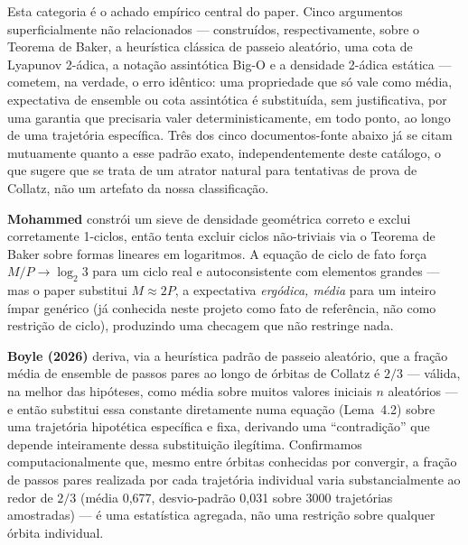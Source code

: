 \documentclass[11pt]{article}
\begin{document}
Esta categoria é o achado empírico central do paper. Cinco argumentos
superficialmente não relacionados --- construídos, respectivamente,
sobre o Teorema de Baker, a heurística clássica de passeio aleatório,
uma cota de Lyapunov 2-ádica, a notação assintótica Big-O e a
densidade 2-ádica estática --- cometem, na verdade, o erro idêntico:
uma propriedade que só vale como média, expectativa de ensemble ou cota
assintótica é substituída, sem justificativa, por uma garantia que
precisaria valer deterministicamente, em todo ponto, ao longo de uma
trajetória específica. Três dos cinco documentos-fonte abaixo já se
citam mutuamente quanto a esse padrão exato, independentemente deste
catálogo, o que sugere que se trata de um atrator natural para
tentativas de prova de Collatz, não um artefato da nossa classificação.

\textbf{Mohammed} \cite{Mohammed2024} constrói um sieve de densidade
geométrica correto e exclui corretamente 1-ciclos, então tenta excluir
ciclos não-triviais via o Teorema de Baker sobre formas lineares em
logaritmos. A equação de ciclo de fato força $M/P \to \log_2 3$ para um
ciclo real e autoconsistente com elementos grandes --- mas o paper
substitui $M \approx 2P$, a expectativa \emph{ergódica, média} para um
inteiro ímpar genérico (já conhecida neste projeto como fato de
referência, não como restrição de ciclo), produzindo uma checagem que
não restringe nada.

\textbf{Boyle (2026)} \cite{Boyle2026} deriva, via a heurística padrão
de passeio aleatório, que a fração média de ensemble de passos pares ao
longo de órbitas de Collatz é $2/3$ --- válida, na melhor das
hipóteses, como média sobre muitos valores iniciais $n$ aleatórios ---
e então substitui essa constante diretamente numa equação (Lema~4.2)
sobre uma trajetória hipotética específica e fixa, derivando uma
``contradição'' que depende inteiramente dessa substituição ilegítima.
Confirmamos computacionalmente que, mesmo entre órbitas conhecidas por
convergir, a fração de passos pares realizada por cada trajetória
individual varia substancialmente ao redor de $2/3$ (média 0,677,
desvio-padrão 0,031 sobre 3000 trajetórias amostradas) --- é uma
estatística agregada, não uma restrição sobre qualquer órbita
individual.
\end{document}
